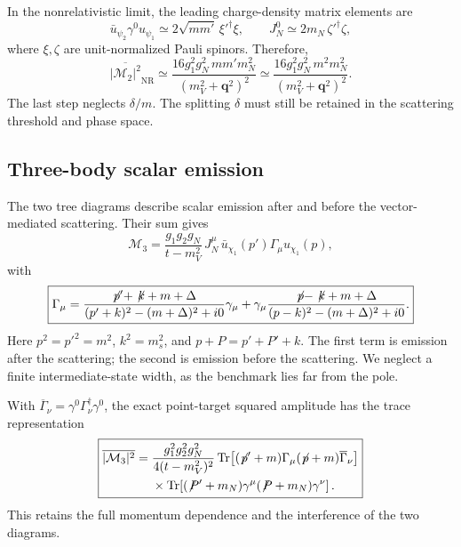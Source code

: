\documentclass[prd,showpacs,preprintnumbers,amsmath,amssymb,twocolumn,
superscriptaddress,notitlepage]{revtex4-2}
\newcommand{\slsh}[1]{\not\!#1}
\newcommand{\Tr}{\operatorname{Tr}}
\newcommand{\NR}{\mathrm{NR}}
\newcommand{\Msq}[1]{\overline{|\mathcal{M}_{#1}|^2}}
\newcommand{\qvec}{\boldsymbol{q}}
\begin{document}
In the nonrelativistic limit, the leading charge-density matrix elements are
\begin{equation}
\bar u_{\psi_2}\gamma^0u_{\psi_1}
\simeq2\sqrt{mm'}\,\xi'^\dagger\xi,\qquad
J_N^0\simeq2m_N\,\zeta'^\dagger\zeta,
\end{equation}
where $\xi,\zeta$ are unit-normalized Pauli spinors. Therefore,
\begin{equation}
\boxed{
\Msq{2}_{\NR}
\simeq
\frac{16g_1^2g_N^2\,mm'm_N^2}{(m_V^2+\qvec^2)^2}
\simeq
\frac{16g_1^2g_N^2\,m^2m_N^2}{(m_V^2+\qvec^2)^2}.
}
\label{eq:msq-two-nr}
\end{equation}
The last step neglects $\delta/m$. The splitting $\delta$ must still
be retained in the scattering threshold and phase space.

\subsection{Three-body scalar emission}

The two tree diagrams describe scalar emission after and before the
vector-mediated scattering. Their sum gives
\begin{equation}
\boxed{
\mathcal{M}_3=
\frac{g_1g_2g_N}{t-m_V^2}\,
J_N^\mu\,\bar u_{\chi_1}(p')\Gamma_\mu u_{\chi_1}(p),
}
\label{eq:amp-three}
\end{equation}
with
\begin{equation}
\boxed{
\Gamma_\mu=
\frac{\slsh{p'}+\slsh{k}+m+\Delta}
     {(p'+k)^2-(m+\Delta)^2+i0}\gamma_\mu
+
\gamma_\mu
\frac{\slsh{p}-\slsh{k}+m+\Delta}
     {(p-k)^2-(m+\Delta)^2+i0}.
}
\label{eq:gamma-three}
\end{equation}
Here $p^2=p'^2=m^2$, $k^2=m_s^2$, and $p+P=p'+P'+k$.
The first term is emission after the scattering; the second is emission
before the scattering. We neglect a finite intermediate-state width,
as the benchmark lies far from the pole.

With $\overline{\Gamma}_\nu=\gamma^0\Gamma_\nu^\dagger\gamma^0$, the
exact point-target squared amplitude has the trace representation
\begin{equation}
\boxed{\begin{aligned}
\Msq{3}
={}&\frac{g_1^2g_2^2g_N^2}{4(t-m_V^2)^2}
\Tr\!\left[
(\slsh{p'}+m)\Gamma_\mu(\slsh{p}+m)\overline{\Gamma}_\nu
\right]\\
&\times\Tr\!\left[
(\slsh{P'}+m_N)\gamma^\mu(\slsh{P}+m_N)\gamma^\nu
\right].
\end{aligned}}
\label{eq:msq-three-exact}
\end{equation}
This retains the full momentum dependence and the interference of
the two diagrams.
\end{document}
